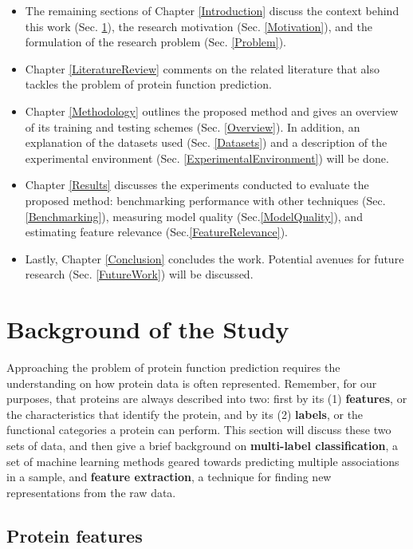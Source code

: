 \begin{itemize} 
    \item The remaining sections of Chapter \ref{Introduction}
        discuss the context behind this work (Sec. \ref{Background}), the
        research motivation (Sec. \ref{Motivation}), and the formulation of the
        research problem (Sec. \ref{Problem}).  
    \item Chapter \ref{LiteratureReview} comments on the related literature
        that also tackles the problem of protein function prediction. 
    \item Chapter \ref{Methodology} outlines the proposed method
        and gives an overview of its training and testing schemes (Sec. 
        \ref{Overview}). In addition, an explanation of the datasets used (Sec.
        \ref{Datasets}) and a description of the experimental environment
        (Sec. \ref{ExperimentalEnvironment}) will be done. 
    \item Chapter \ref{Results} discusses the experiments conducted to evaluate the 
        proposed method: benchmarking performance with other techniques 
        (Sec. \ref{Benchmarking}), measuring model quality (Sec.\ref{ModelQuality}),
        and estimating feature relevance (Sec.\ref{FeatureRelevance}).
    \item Lastly, Chapter \ref{Conclusion} concludes the work. Potential avenues for 
        future research (Sec. \ref{FutureWork}) will be discussed.
\end{itemize}


\section{Background of the Study}
\label{Background}

Approaching the problem of protein function prediction requires the
understanding on how protein data is often represented. Remember, for our purposes,
that proteins are always described into two: first by its (1) \textbf{features},
or the characteristics that identify the protein, and by its (2) \textbf{labels}, or the
functional categories a protein can perform. This section will discuss
these two sets of data, and then give a brief background on \textbf{multi-label classification},
a set of machine learning methods geared towards predicting multiple associations
in a sample, and \textbf{feature extraction}, a technique for finding new
representations from the raw data.

\subsection{Protein features}

